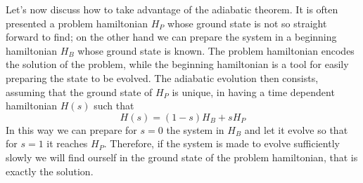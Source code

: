 \noindent
Let's now discuss how to take advantage of the adiabatic theorem. It is often presented a problem hamiltonian $H_P$ whose ground state is not so straight forward to find; on the other hand we can prepare the system in a beginning hamiltonian $H_B$ whose ground state is known. The problem hamiltonian encodes the solution of the problem, while the beginning hamiltonian is a tool for easily preparing the state to be evolved. The adiabatic evolution then consists, assuming that the ground state of $H_P$ is unique, in having a time dependent hamiltonian $H(s)$ such that
    \begin{equation}
        H(s) = (1-s)H_B + s H_P
    \end{equation}
    In this way we can prepare for $s=0$ the system in $H_B$ and let it evolve so that for $s=1$ it reaches $H_P$. Therefore, if the system is made to evolve sufficiently slowly we will find ourself in the ground state of the problem hamiltonian, that is exactly the solution.

